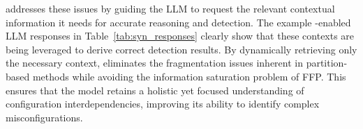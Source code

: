 \sysname{} addresses these issues by guiding the LLM to request the relevant contextual information it needs for accurate reasoning and detection. The example \sysname{}-enabled LLM responses in Table~\ref{tab:syn_responses} clearly show that these contexts are being leveraged to derive correct detection results.  By dynamically retrieving only the necessary context, \sysname{} eliminates the fragmentation issues inherent in partition-based methods while avoiding the information saturation problem of FFP. This ensures that the model retains a holistic yet focused understanding of configuration interdependencies, improving its ability to identify complex misconfigurations.




